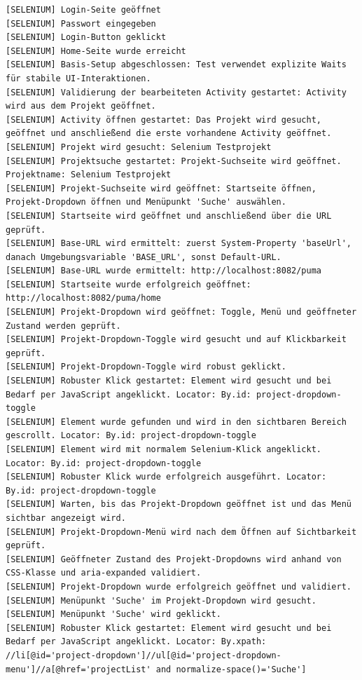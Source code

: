 \begin{lstlisting}[caption={Selenium -- Kontrolllauf Activity bearbeiten (Erfolgreich)}, label={lst:sel_ctrl_act_ok}, style=logStyle]
[SELENIUM] Login-Seite geöffnet
[SELENIUM] Passwort eingegeben
[SELENIUM] Login-Button geklickt
[SELENIUM] Home-Seite wurde erreicht
[SELENIUM] Basis-Setup abgeschlossen: Test verwendet explizite Waits für stabile UI-Interaktionen.
[SELENIUM] Validierung der bearbeiteten Activity gestartet: Activity wird aus dem Projekt geöffnet.
[SELENIUM] Activity öffnen gestartet: Das Projekt wird gesucht, geöffnet und anschließend die erste vorhandene Activity geöffnet.
[SELENIUM] Projekt wird gesucht: Selenium Testprojekt
[SELENIUM] Projektsuche gestartet: Projekt-Suchseite wird geöffnet. Projektname: Selenium Testprojekt
[SELENIUM] Projekt-Suchseite wird geöffnet: Startseite öffnen, Projekt-Dropdown öffnen und Menüpunkt 'Suche' auswählen.
[SELENIUM] Startseite wird geöffnet und anschließend über die URL geprüft.
[SELENIUM] Base-URL wird ermittelt: zuerst System-Property 'baseUrl', danach Umgebungsvariable 'BASE_URL', sonst Default-URL.
[SELENIUM] Base-URL wurde ermittelt: http://localhost:8082/puma
[SELENIUM] Startseite wurde erfolgreich geöffnet: http://localhost:8082/puma/home
[SELENIUM] Projekt-Dropdown wird geöffnet: Toggle, Menü und geöffneter Zustand werden geprüft.
[SELENIUM] Projekt-Dropdown-Toggle wird gesucht und auf Klickbarkeit geprüft.
[SELENIUM] Projekt-Dropdown-Toggle wird robust geklickt.
[SELENIUM] Robuster Klick gestartet: Element wird gesucht und bei Bedarf per JavaScript angeklickt. Locator: By.id: project-dropdown-toggle
[SELENIUM] Element wurde gefunden und wird in den sichtbaren Bereich gescrollt. Locator: By.id: project-dropdown-toggle
[SELENIUM] Element wird mit normalem Selenium-Klick angeklickt. Locator: By.id: project-dropdown-toggle
[SELENIUM] Robuster Klick wurde erfolgreich ausgeführt. Locator: By.id: project-dropdown-toggle
[SELENIUM] Warten, bis das Projekt-Dropdown geöffnet ist und das Menü sichtbar angezeigt wird.
[SELENIUM] Projekt-Dropdown-Menü wird nach dem Öffnen auf Sichtbarkeit geprüft.
[SELENIUM] Geöffneter Zustand des Projekt-Dropdowns wird anhand von CSS-Klasse und aria-expanded validiert.
[SELENIUM] Projekt-Dropdown wurde erfolgreich geöffnet und validiert.
[SELENIUM] Menüpunkt 'Suche' im Projekt-Dropdown wird gesucht.
[SELENIUM] Menüpunkt 'Suche' wird geklickt.
[SELENIUM] Robuster Klick gestartet: Element wird gesucht und bei Bedarf per JavaScript angeklickt. Locator: By.xpath: //li[@id='project-dropdown']//ul[@id='project-dropdown-menu']//a[@href='projectList' and normalize-space()='Suche']

\end{lstlisting}

